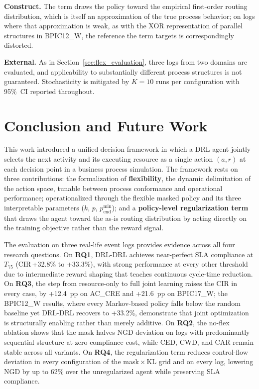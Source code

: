 \documentclass[journal,onecolumn]{IEEEtran}
\begin{document}
\noindent\textbf{Construct.}
The term draws the policy toward the empirical first-order routing
distribution, which is itself an approximation of the true process
behavior; on logs where that approximation is weak, as with the XOR
representation of parallel structures in BPIC12\_W, the reference the
term targets is correspondingly distorted.

\noindent\textbf{External.}
As in Section~\ref{sec:flex_evaluation}, three logs from two domains
are evaluated, and applicability to substantially different process
structures is not guaranteed. Stochasticity is mitigated by $K=10$ runs
per configuration with 95\%~CI reported throughout.


\section{Conclusion and Future Work}
\label{sec:conclusion}

This work introduced a unified decision framework in which a DRL
agent jointly selects the next activity and its executing resource
as a single action $(a,r)$ at each decision point in a business
process simulation. The framework rests on three contributions: the
formalization of \textbf{flexibility}, the dynamic delimitation of
the action space, tunable between process conformance and operational
performance; operationalized through the flexible masked policy and
its three interpretable parameters ($k$, $p$, $p_{\mathrm{end}}^{\min}$);
and a \textbf{policy-level regularization term} that draws the agent
toward the as-is routing distribution by acting directly on the
training objective rather than the reward signal.

The evaluation on three real-life event logs provides evidence across
all four research questions. On \textbf{RQ1}, DRL-DRL achieves
near-perfect SLA compliance at $T_{75}$ (CIR\,+32.8\% to +33.3\%),
with strong performance at every other threshold due to intermediate
reward shaping that teaches continuous cycle-time reduction. On
\textbf{RQ3}, the step from resource-only to full joint learning
raises the CIR in every case, by +12.4~pp on AC\_CRE and +21.6~pp
on BPIC17\_W; the BPIC12\_W results, where every Markov-based
policy falls below the random baseline yet DRL-DRL recovers to
+33.2\%, demonstrate that joint optimization is structurally
enabling rather than merely additive.
On \textbf{RQ2}, the no-flex ablation shows that the mask halves NGD
deviation on logs with predominantly sequential structure at zero
compliance cost, while CED, CWD, and CAR remain stable across all
variants. On \textbf{RQ4}, the regularization term reduces
control-flow deviation in every configuration of the
mask\,$\times$\,KL grid and on every log, lowering NGD by up to 62\%
over the unregularized agent while preserving SLA compliance.
\end{document}
